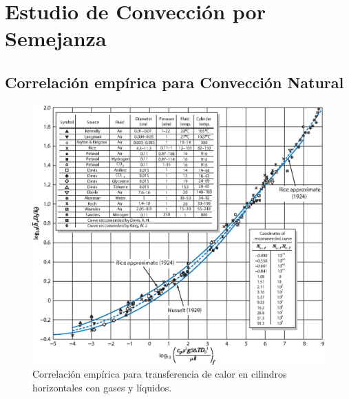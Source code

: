 





\section{Estudio de Convección por Semejanza}
\subsection{Correlación empírica para Convección Natural}
\begin{figure}[htb!]
    \centering
    \includegraphics[width=\textwidth/2]{graf.eps}
    \caption{Correlación empírica para transferencia de calor en cilindros horizontales con gases y líquidos.\cite{kreith2011principles}}
    \label{graf:NusseltNaturalConvectionHorizontalCilinder}
\end{figure}
